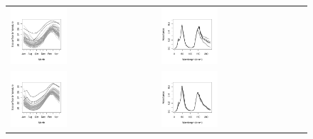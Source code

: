 \begin{figure}[t!]
\begin{center}
\begin{tabular}{ll}
\includegraphics[width=0.4\textwidth]{./Plots/Elnino_functional1} &
\includegraphics[width=0.4\textwidth]{./Plots/Octane_functional1}\\
\includegraphics[width=0.4\textwidth]{./Plots/Elnino_functional2} &
\includegraphics[width=0.4\textwidth]{./Plots/Octane_functional2}\\

\end{tabular}
\end{center}
\end{figure}
